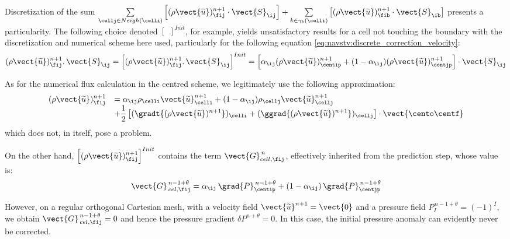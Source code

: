 Discretization of the sum $\sum\limits_{\cellj \in Neigh{(\celli)}}{\left[ (\rho
\vect{\widetilde{u}})^{n+1}_{\fij} \cdot \vect{S}_{\ij}\right]} +
\sum\limits_{k\in {\gamma_b(\celli)}} \left[{(\rho \vect{\widetilde{u}})^{n+1}_{\fib}} \cdot \vect{S}_{\ib}\right]$ presents a particularity. The following choice denoted $\left[{\ \ }\right]^{Init}$, 
for example, yields unsatisfactory results for a cell not touching the boundary with the discretization and 
numerical scheme here used, particularly for the following equation
\eqref{eq:navstv:discrete_correction_velocity}:
\begin{equation}
(\rho \vect{\widetilde{u}})^{n+1}_{\fij}.\,\vect{S}_{\ij}=
\left[(\rho \vect{\widetilde{u}})^{n+1}_{\fij}.\,\vect{S}_{\ij}\right]^{Init}=
\left[\alpha_{\ij} (\rho\vect{\widetilde{u}})^{n+1}_{\centip} +
(1-\alpha_{\ij}) (\rho\vect{\widetilde{u}})^{n+1}_{\centjp}\right] \cdot \vect{S}_{\ij}
\end{equation}

As for the numerical flux calculation in the centred scheme, we legitimately
use the following approximation:
\begin{equation}
\begin{array}{ll}
(\rho \vect{\widetilde{u}})^{n+1}_{\fij}&=
\alpha_{\ij} \rho_{\celli} \vect{\widetilde{u}}^{n+1}_{\celli} +
(1-\alpha_{\ij}) \rho_{\cellj} \vect{\widetilde{u}}^{n+1}_{\cellj}\\
&+\displaystyle \frac{1}{2}\left[(\gradt{(\rho\vect{\widetilde{u}})^{n+1}})_\celli
+ (\ggrad{(\rho\vect{\widetilde{u}})^{n+1}})_\cellj \right]\cdot \vect{\cento \centf}
\end{array}
\end{equation}
which does not, in itself, pose a problem.

On the other hand, $ \left[(\rho\vect{\widetilde{u}})^{n+1}_{\fij}\right]^{Init}$
contains the term $\vect{G}^{\,n}_{cell ,\fij}$, effectively inherited from the prediction step, whose value is:\\
\begin{equation*}
\vect{G}^{\,n-1+\theta}_{\,cel,\fij}=\alpha_{\ij}\, \grad{P}^{\,n-1+\theta}_{\centip} +
(1-\alpha_{\ij})\, \grad{P}^{\,n-1+\theta}_{\centjp}
\end{equation*}

However, on a regular orthogonal Cartesian mesh, with a velocity field
$\vect{\widetilde{u}}^{n+1}=\vect{0}$ and a pressure field $P^{\,n-1+\theta}_I=(-1)^{I}$,
we obtain $\vect{G}^{\,n-1+\theta}_{\,cel, \fij}=0$ and hence the pressure gradient
$\delta P^{n+\theta}=0$. In this case, the initial pressure anomaly can evidently
never be corrected.

